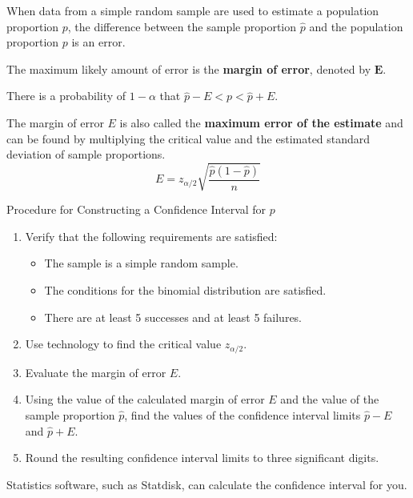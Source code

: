 \documentclass{beamer}
\begin{document}
\begin{frame}
\begin{definition}
When data from a simple random sample are used to estimate a population proportion $p$, the difference between the sample proportion $\hat{p}$ and the population proportion $p$ is an error.\pause

\vspace{2mm}
The maximum likely amount of error is the \textbf{margin of error}, denoted by $\boldsymbol{E}$. \pause

\vspace{2mm}
There is a probability of $1-\alpha$ that $\hat{p} - E < p < \hat{p} + E$.\pause
\end{definition}

\begin{note}
The margin of error $E$ is also called the \textbf{maximum error of the estimate} and can be found by multiplying the critical value and the estimated standard deviation of sample proportions.
\begin{equation*}
E=z_{\alpha/2}\sqrt{\dfrac{\hat{p}(1-\hat{p})}{n}}
\end{equation*}
\end{note}
\end{frame}

\begin{frame}
\begin{block}{Procedure for Constructing a Confidence Interval for $p$}
\begin{enumerate}[<+- | alert@+>]
\item Verify that the following requirements are satisfied:
\begin{itemize}
\item The sample is a simple random sample.
\item The conditions for the binomial distribution are satisfied.
\item There are at least 5 successes and at least 5 failures.
\end{itemize}
\item Use technology to find the critical value $z_{\alpha/2}$.
\item Evaluate the margin of error $E$.
\item Using the value of the calculated margin of error $E$ and the value of the sample proportion $\hat{p}$, find the values of the confidence interval limits $\hat{p}-E$ and $\hat{p}+E$.
\item Round the resulting confidence interval limits to three significant digits.
\end{enumerate}
\end{block}
\onslide<+->
\begin{note}
Statistics software, such as Statdisk, can calculate the confidence interval for you.
\end{note}
\end{frame}
\end{document}
